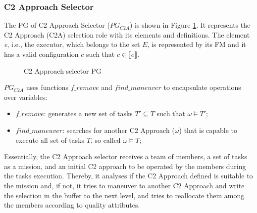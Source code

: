 

\subsubsection{C2 Approach Selector}

The PG of C2 Approach Selector ($PG_{C2A}$) is shown in Figure \ref{c2a}. It represents the C2 Approach (C2A) selection role with its elements and definitions. The element \textit{e}, i.e., the executor, which belongs to the set $E$, is represented by its FM and it has a valid  configuration $c$ such that  $c \in \llbracket e \rrbracket $.



\begin{figure}[h]
\centering

\label{c2a}
\caption{C2 Approach selector PG}
\end{figure}

 $PG_{C2A}$ uses functions $f\_remove$ and $find\_maneuver$ to encapsulate operations over variables:
\begin{itemize}
    \item $f\_remove$:  generates a new set of tasks $T' \subseteq T$ such that $\omega \models T'$;
    \item $find\_maneuver$: searches for another C2 Approach ($\omega$) that is capable to execute all set of tasks $T$, so called $\omega \models T$;
\end{itemize}

Essentially, the C2 Approach selector receives a team of members, a set of tasks as a mission, and an initial C2 approach to be operated by the members during the tasks execution. Thereby, it analyses if the C2 Approach defined is suitable to the mission and, if not, it tries to maneuver to another C2 Approach and write the selection in the buffer to the next level, and tries to reallocate them among the members according to quality attributes. 

